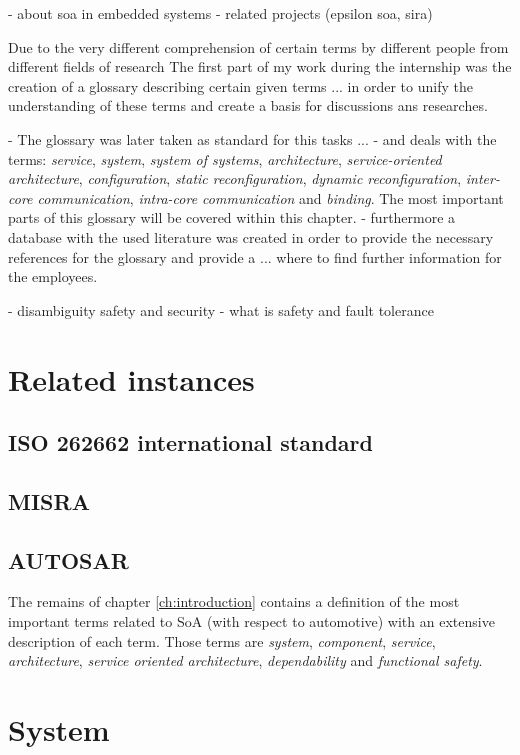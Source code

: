 \label{ch:introduction}
- about soa in embedded systems
- related projects (epsilon soa, sira)

Due to the very different comprehension of certain terms by different people from different fields of research 
The first part of my work during the internship was the creation of a glossary describing certain given terms
... in order to unify the understanding of these terms and create a basis for discussions ans researches.

- The glossary was later taken as standard for this tasks ...
- and deals with the terms: \emph{service}, \emph{system}, \emph{system of systems}, \emph{architecture}, \emph{service-oriented architecture}, \emph{configuration}, \emph{static reconfiguration}, \emph{dynamic reconfiguration}, \emph{inter-core communication}, \emph{intra-core communication} and \emph{binding}.
The most important parts of this glossary will be covered within this chapter.
- furthermore a database with the used literature was created in order to provide the necessary references for the glossary and provide a ... where to find further information for the employees. 

- disambiguity safety and security
- what is safety and fault tolerance

\section{Related instances}
\subsection{ISO 262662 international standard}
\subsection{MISRA}
\subsection{AUTOSAR}

The remains of chapter \ref{ch:introduction} contains a definition of the most important terms related to SoA (with respect to automotive) with an extensive description of each term. Those terms are \emph{system}, \emph{component}, \emph{service}, \emph{architecture}, \emph{service oriented architecture}, \emph{dependability} and \emph{functional safety}.





\section{System}

